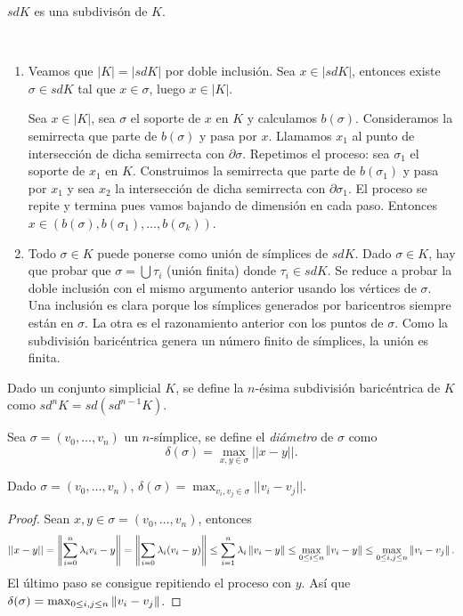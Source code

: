\documentclass[HS.tex]{subfiles}
\begin{document}
\begin{prop}
$sd K$ es una subdivisón de $K$.
\end{prop}
\begin{dem}\
\begin{enumerate}
\item Veamos que $|K|=|sd K|$ por doble inclusión.
Sea $x \in |sdK|$, entonces existe $σ \in sd K$ tal que $x \in σ$, luego $x \in |K|$.

Sea $x \in |K|$, sea $σ$ el soporte de $x$ en $K$ y calculamos $b(σ)$. Consideramos la semirrecta que parte de $b(\sigma)$ y pasa por $x$. Llamamos $x_1$ al punto de intersección de dicha semirrecta con $\partial\sigma$. Repetimos el proceso: sea $\sigma_1$ el soporte de $x_1$ en $K$. Construimos la semirrecta que parte de $b(\sigma_1)$ y pasa por $x_1$ y sea $x_2$ la intersección de dicha semirrecta con $\partial\sigma_1$. El proceso se repite y termina pues vamos bajando de dimensión en cada paso. Entonces $x\in (b(\sigma),b(\sigma_1),\dots,b(\sigma_k))$. 

\item Todo $\sigma\in K$ puede ponerse como unión de símplices de $sdK$. Dado $\sigma\in K$, hay que probar que $\sigma=\bigcup \tau_i$ (unión finita) donde $\tau_i\in sdK$. Se reduce a probar la doble inclusión con el mismo argumento anterior usando los vértices de $\sigma$. Una inclusión es clara porque los símplices generados por baricentros siempre están en $\sigma$. La otra es el razonamiento anterior con los puntos de $\sigma$. Como la subdivisión baricéntrica genera un número finito de símplices, la unión es finita.
\end{enumerate}
\QED
\end{dem}

\begin{defi}
Dado un conjunto simplicial $K$, se define la $n$-ésima subdivisión baricéntrica de $K$ como $sd^nK=sd(sd^{n-1}K)$.
\end{defi}

\begin{defi}
Sea $\sigma=(v_0,\dots, v_n)$ un $n$-símplice, se define el \emph{diámetro} de $\sigma$ como 
\[
\delta(\sigma)=\max_{x,y\in\sigma}||x-y||.
\]
\end{defi}

\begin{lemma}
Dado $\sigma=(v_0,\dots,v_n)$, $\delta(\sigma)=\max_{v_i,v_j\in\sigma}||v_i-v_j||$.
\end{lemma}
\begin{proof}
Sean $x,y\in\sigma=(v_0,\dots, v_n)$, entonces 
\[
||x-y||= \left\lVert\sum_{i=0}^n\lambda_iv_i-y\right\rVert=\left\lVert\sum_{i=0}\lambda_i(v_i-y)\right\rVert\leq\sum_{i=1}^n\lambda_i\left\lVert v_i-y\right\rVert\leq \max_{0\leq i\leq n}\left\lVert v_i-y\right\rVert\leq\max_{0\leq i,j\leq n}\left\lVert v_i-v_j\right\rVert.
\]
El último paso se consigue repitiendo el proceso con $y$. Así que $\delta(\sigma)=\max_{0\leq i,j\leq n}\left\lVert v_i-v_j\right\rVert$.
\end{proof}
\end{document}
